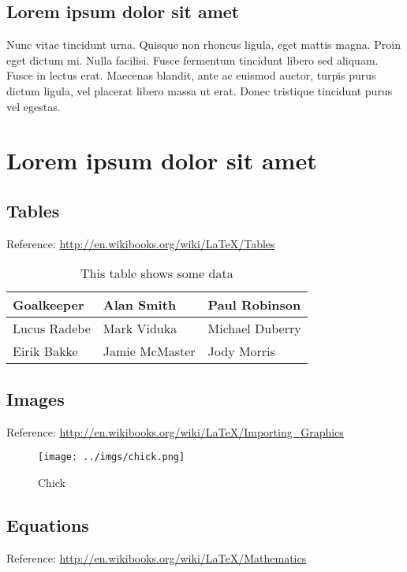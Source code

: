 \documentclass{projetofinal-dcc}
\begin{document}
\section{Lorem ipsum dolor sit amet}\label{sec:LABEL_CHP_1_SEC_J}
Nunc vitae tincidunt urna. Quisque non rhoncus ligula, eget mattis magna. Proin eget dictum mi. Nulla facilisi. Fusce fermentum tincidunt libero sed aliquam. Fusce in lectus erat. Maecenas blandit, ante ac euismod auctor, turpis purus dictum ligula, vel placerat libero massa ut erat. Donec tristique tincidunt purus vel egestas.

\chapter{Lorem ipsum dolor sit amet}\label{chp:LABEL_CHP_2}

\section{Tables}\label{sec:LABEL_CHP_2_SEC_A}
Reference: \url{http://en.wikibooks.org/wiki/LaTeX/Tables}

\begin{table}[!h]
  \centering
  \begin{tabular}{ |l|l|l| }
    \hline
      Goalkeeper & Alan Smith & Paul Robinson \\
    \hline
      Lucus Radebe &  Mark Viduka & Michael Duberry \\
    \hline
      Eirik Bakke & Jamie McMaster & Jody Morris \\
    \hline
  \end{tabular}
  \caption{This table shows some data}
  \label{tab:LABEL_TAB_1}
\end{table}

\section{Images}\label{sec:LABEL_CHP_2_SEC_B}
Reference: \url{http://en.wikibooks.org/wiki/LaTeX/Importing_Graphics}

\begin{figure}
  \centering
  \texttt{[image: ../imgs/chick.png]}
  \caption{Chick}
  \label{fig:LABEL_FIG_1}
\end{figure}

\section{Equations}\label{sec:LABEL_CHP_2_SEC_C}
Reference: \url{http://en.wikibooks.org/wiki/LaTeX/Mathematics}
\end{document}
